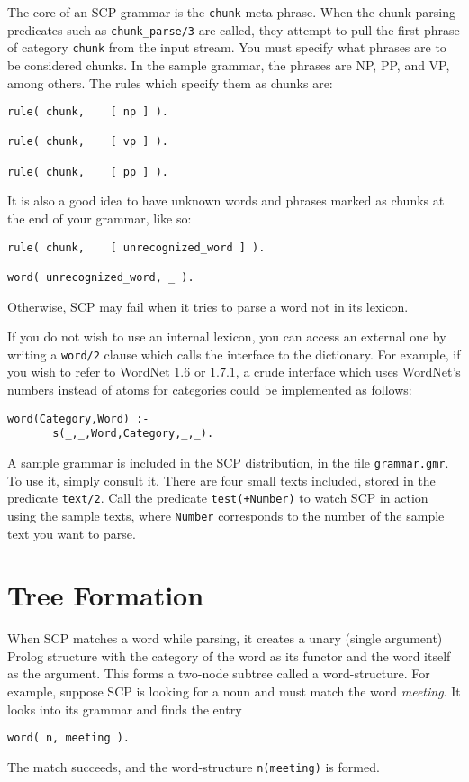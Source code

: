 \documentclass[12pt]{article}
\begin{document}
The core of an SCP grammar is the \verb+chunk+ meta-phrase.  When the chunk parsing predicates such as \verb+chunk_parse/3+ are called, they attempt to pull the first phrase of category \verb+chunk+ from the input stream.  You must specify what phrases are to be considered chunks.  In the sample grammar, the phrases are NP, PP, and VP, among others.  The rules which specify them as chunks are:
\begin{verbatim}
rule( chunk,    [ np ] ).

rule( chunk,    [ vp ] ).

rule( chunk,    [ pp ] ).
\end{verbatim}
It is also a good idea to have unknown words and phrases marked as chunks at the end of your grammar, like so:
\begin{verbatim}
rule( chunk,    [ unrecognized_word ] ).

word( unrecognized_word, _ ).
\end{verbatim}
Otherwise, SCP may fail when it tries to parse a word not in its lexicon.

If you do not wish to use an internal lexicon, you can access an external one by writing a \verb+word/2+ clause which calls the interface to the dictionary.  For example, if you wish to refer to WordNet $1.6$ or $1.7.1$, a crude interface which uses WordNet's numbers instead of atoms for categories could be implemented as follows:
\begin{verbatim}
word(Category,Word) :-
       s(_,_,Word,Category,_,_).
\end{verbatim}

A sample grammar is included in the SCP distribution, in the file \verb+grammar.gmr+.  To use it, simply consult it.  There are four small texts included, stored in the predicate \verb+text/2+.   Call the predicate \verb!test(+Number)! to watch SCP in action using the sample texts, where \verb+Number+ corresponds to the number of the sample text you want to parse.

\section{Tree Formation}

When SCP matches a word while parsing, it creates a unary (single argument) Prolog structure with the category of the word as its functor and the word itself as the argument.  This forms a two-node subtree called a word-structure.  For example, suppose SCP is looking for a noun and must match the word \emph{meeting}.  It looks into its grammar and finds the entry
\begin{verbatim}
word( n, meeting ).
\end{verbatim}
The match succeeds, and the word-structure \verb+n(meeting)+ is formed.
\end{document}
